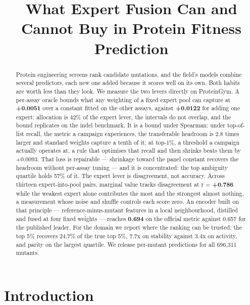 \documentclass{article}
\begin{document}
\linenumbers

\title{What Expert Fusion Can and Cannot Buy in Protein Fitness Prediction}

\author{}
\maketitle

\begin{abstract}
Protein engineering screens rank candidate mutations, and the field's models combine several predictors, each new
one added because it scores well on its own. Both habits are worth less than they look. We measure the two levers
directly on ProteinGym. A per-assay oracle bounds what any weighting of a fixed expert pool can capture at
\textbf{+0.0051} over a constant fitted on the other assays, against \textbf{+0.0122} for adding one expert:
allocation is 42\% of the expert lever, the intervals do not overlap, and the bound replicates on the indel
benchmark. It is a bound under Spearman: under top-of-list recall, the metric a campaign experiences, the
transferable headroom is 2.8 times larger and standard weights capture a tenth of it; at top-1\%, a threshold a
campaign actually operates at, a rule that optimises that recall and then shrinks beats them by +0.0093. That loss is repairable —
shrinkage toward the panel constant recovers the headroom without per-assay tuning — and it is concentrated: the
top ambiguity quartile holds 57\% of it. The expert lever is disagreement, not accuracy. Across thirteen
expert-into-pool pairs, marginal value tracks disagreement at r = \textbf{+0.786} while the weakest expert alone
contributes the most and the strongest almost nothing, a measurement whose noise and shuffle controls each score
zero. An encoder built on that principle — reference-minus-mutant features in a local neighbourhood,
distilled and fused at four fixed weights — reaches \textbf{0.694} on the official metric against 0.657 for the
published leader. For the domain we report where the ranking can be trusted: the top 5\% recovers 24.7\% of the
true top 5\%, 7.7x on stability against 3.4x on activity, and parity on the largest quartile. We release
per-mutant predictions for all 696,311 mutants.
\end{abstract}
\section{Introduction}\label{introduction}
\end{document}
